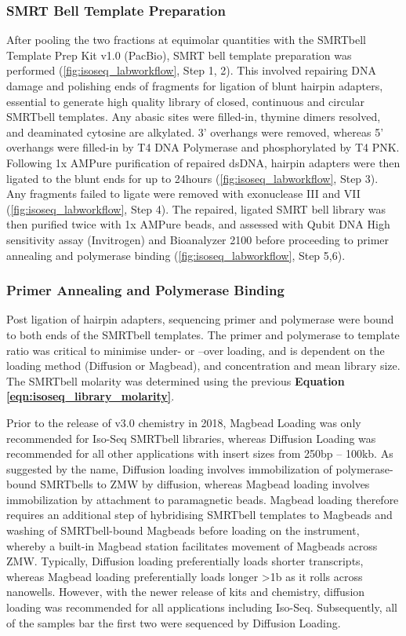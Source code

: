 \subsubsection{SMRT Bell Template Preparation}
\label{section:ch2_smrtbelltemplate_explanation} 
After pooling the two fractions at equimolar quantities with the SMRTbell Template Prep Kit v1.0 (PacBio), SMRT bell template preparation was performed (\cref{fig:isoseq_labworkflow}, Step 1, 2). This involved repairing DNA damage and polishing ends of fragments for ligation of blunt hairpin adapters, essential to generate high quality library of closed, continuous and circular SMRTbell templates. Any abasic sites were filled-in, thymine dimers resolved, and deaminated cytosine are alkylated. 3’ overhangs were removed, whereas 5’ overhangs were filled-in by T4 DNA Polymerase and phosphorylated by T4 PNK. Following 1x AMPure purification of repaired dsDNA, hairpin adapters were then ligated to the blunt ends for up to 24hours (\cref{fig:isoseq_labworkflow}, Step 3). Any fragments failed to ligate were removed with exonuclease III and VII (\cref{fig:isoseq_labworkflow}, Step 4). The repaired, ligated SMRT bell library was then purified twice with 1x AMPure beads, and assessed with Qubit DNA High sensitivity assay (Invitrogen) and Bioanalyzer 2100 before proceeding to primer annealing and polymerase binding (\cref{fig:isoseq_labworkflow}, Step 5,6). 

\subsubsection{Primer Annealing and Polymerase Binding} 
\label{section:ch2_polbinding_loading}
Post ligation of hairpin adapters, sequencing primer and polymerase were bound to both ends of the SMRTbell templates. The primer and polymerase to template ratio was critical to minimise under- or –over loading, and is dependent on the loading method (Diffusion or Magbead), and concentration and mean library size. The SMRTbell molarity was determined using the previous \textbf{Equation \ref{eqn:isoseq_library_molarity}}.

Prior to the release of v3.0 chemistry in 2018, Magbead Loading was only recommended for Iso-Seq SMRTbell libraries, whereas Diffusion Loading was recommended for all other applications with insert sizes from 250bp – 100kb. As suggested by the name, Diffusion loading involves immobilization of polymerase-bound SMRTbells to ZMW by diffusion, whereas Magbead loading involves immobilization by attachment to paramagnetic beads. Magbead loading therefore requires an additional step of hybridising SMRTbell templates to Magbeads and washing of SMRTbell-bound Magbeads before loading on the instrument, whereby a built-in Magbead station facilitates movement of Magbeads across ZMW. Typically, Diffusion loading preferentially loads shorter transcripts, whereas Magbead loading preferentially loads longer >1b as it rolls across nanowells. However, with the newer release of kits and chemistry, diffusion loading was recommended for all applications including Iso-Seq. Subsequently, all of the samples bar the first two were sequenced by Diffusion Loading. 



